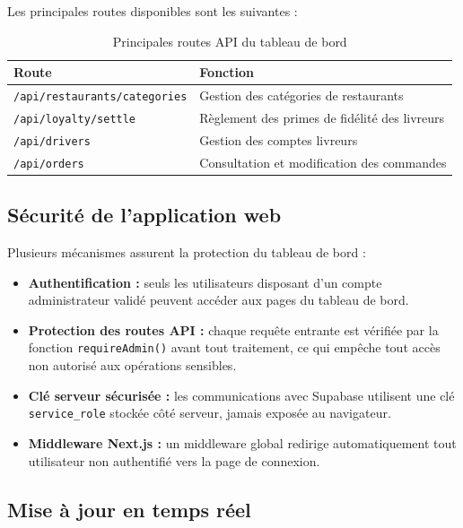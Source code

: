 \documentclass[12pt,fleqn,a4paper]{report}
\begin{document}
\begin{justify}
Les principales routes disponibles sont les suivantes :

\begin{table}[H]
\centering
\renewcommand{\arraystretch}{1.4}
\begin{tabular}{|l|l|}
\hline
\textbf{Route} & \textbf{Fonction} \\
\hline
\texttt{/api/restaurants/categories} &
Gestion des catégories de restaurants \\
\hline
\texttt{/api/loyalty/settle} &
Règlement des primes de fidélité des livreurs \\
\hline
\texttt{/api/drivers} &
Gestion des comptes livreurs \\
\hline
\texttt{/api/orders} &
Consultation et modification des commandes \\
\hline
\end{tabular}
\caption{Principales routes API du tableau de bord}
\end{table}

\subsection{Sécurité de l'application web}

Plusieurs mécanismes assurent la protection du tableau de bord :

\begin{itemize}
    \item \textbf{Authentification :} seuls les utilisateurs
    disposant d'un compte administrateur validé peuvent
    accéder aux pages du tableau de bord.

    \item \textbf{Protection des routes API :} chaque requête
    entrante est vérifiée par la fonction
    \texttt{requireAdmin()} avant tout traitement, ce qui
    empêche tout accès non autorisé aux opérations sensibles.

    \item \textbf{Clé serveur sécurisée :} les communications
    avec Supabase utilisent une clé \texttt{service\_role}
    stockée côté serveur, jamais exposée au navigateur.

    \item \textbf{Middleware Next.js :} un middleware global
    redirige automatiquement tout utilisateur non authentifié
    vers la page de connexion.
\end{itemize}

\subsection{Mise à jour en temps réel}


\end{justify}
\end{document}
